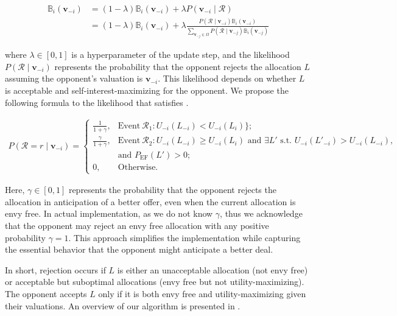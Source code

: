 \begin{align} 
\label{eq:belief-update}
\mathbb{B}_i(\mathbf{v}_{-i}) &= (1 - \lambda) \mathbb{B}_i(\mathbf{v}_{-i}) + \lambda P(\mathbf{v}_{-i} \mid \mathcal{R}) \nonumber \\
 &= (1 - \lambda) \mathbb{B}_i(\mathbf{v}_{-i}) + \lambda \frac{P(\mathcal{R} \mid \mathbf{v}_{-i}) \mathbb{B}_i(\mathbf{v}_{-i})}{\sum\limits_{\mathbf{v}_{-j}\in \Omega} P(\mathcal{R} \mid \mathbf{v}_{-j}) \mathbb{B}_i(\mathbf{v}_{-j})}
\end{align}

where $\lambda \in [0, 1]$ is a hyperparameter of the update step, and the likelihood $P(\mathcal{R} \mid \mathbf{v}_{-i})$ represents the probability that the opponent rejects the allocation $L$ assuming the opponent's valuation is $\mathbf{v}_{-i}$. This likelihood depends on whether $L$ is acceptable and self-interest-maximizing for the opponent. We propose the following formula to the likelihood that satisfies .

\begin{align*} 
P(\mathcal{R} = r \mid \mathbf{v}_{-i}) =
\begin{cases} 
\frac{1}{1+\gamma}, & \text{Event} \ \mathcal{R}_1: U_{-i}(L_{-i}) < U_{-i}(L_i) \}; \\
\frac{\gamma}{1+\gamma}, & \text{Event} \ \mathcal{R}_2: U_{-i}(L_{-i}) \geq U_{-i}(L_i) \text{ and } \exists L' \text{ s.t. } U_{-i}(L'_{-i}) > U_{-i}(L_{-i}), \\
& \text{and } P_{\text{EF}}(L') > 0; \\
0, & \text{Otherwise.}
\end{cases} 
\end{align*}

Here, $\gamma\in [0,1]$ represents the probability that the opponent rejects the allocation in anticipation of a better offer, even when the current allocation is envy free. In actual implementation, as we do not know $\gamma$, thus we acknowledge that the opponent may reject an envy free allocation with any positive probability $\gamma = 1$. This approach simplifies the implementation while capturing the essential behavior that the opponent might anticipate a better deal.

In short, rejection occurs if $L$ is either an unacceptable allocation (not envy free) or acceptable but suboptimal allocations (envy free but not utility-maximizing). The opponent accepts $L$ only if it is both envy free and utility-maximizing given their valuations. An overview of our algorithm is presented in .

